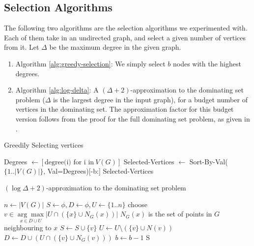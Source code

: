 \documentclass{ociamthesis}
\begin{document}
\subsection*{Selection Algorithms}
The following two algorithms are the selection algorithms we experimented with.
Each of them take in an undirected graph, and select a given number of vertices
from it. Let $\Delta$ be the maximum degree in the given graph.
\begin{enumerate}
    \item Algorithm \ref{alg:greedy-selection}: We simply select $b$ nodes with
    the highest degrees.
    \item Algorithm \ref{alg:log-delta}: A $(\Delta + 2)$-approximation to the
    dominating set problem ($\Delta$ is the largest degree in the input graph),
    for a budget number of vertices in the dominating set. The approximation
    factor for this budget version follows from the proof for the full
    dominating set problem, as given in \citep{dominating-set}.
\end{enumerate}

\begin{algorithm}[!h]
\caption{Greedily Selecting vertices}
\begin{algorithmic}[1]
    \State Degrees $\gets [\text{degree(i) for i in}~V(G)]$
    \State Selected-Vertices $\gets$ Sort-By-Val($\{1..|V(G)|\}$, Val=Degrees)[-b:]
    \State \Return Selected-Vertices
\EndProcedure
\end{algorithmic}
\label{alg:greedy-selection}
\end{algorithm}

\begin{algorithm}[!h]
\caption{$(\log \Delta + 2)$-approximation to the dominating set problem}
\begin{algorithmic}[1]
    \State $n \gets |V(G)|$
    \State $S \gets \phi, D \gets \phi, U \gets \{1..n\}$   
        \State choose $v \in \underset{x \in D\cup U}{\arg\max}|{U\cap (\{x\}\cup N_G(x))}|$
        \Comment $N_G(x)$ is the set of points in $G$ neighbouring to $x$
        \State $S \gets S \cup \{v\}$
        \State $U \gets U \setminus (\{v\}\cup N(v))$
        \State $D \gets D\cup({U\cap (\{v\}\cup N_G(v))})$
        \State $b \gets b - 1$
    \EndWhile
    \State \Return S
\EndProcedure

\end{algorithmic}
\label{alg:log-delta}
\end{algorithm}
\end{document}
